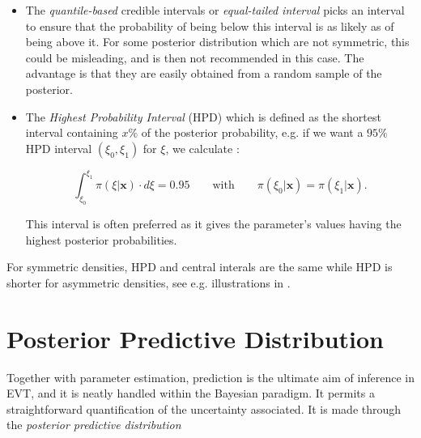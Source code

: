 \begin{itemize}
	\item The \emph{quantile-based} credible intervals or \emph{equal-tailed interval} picks an interval to ensure that the probability of being below this interval is as likely as of being above it. 
	For some posterior distribution which are not symmetric, this could be misleading, and is then not recommended in this case. 
	The advantage is that they are easily obtained from a random sample of the posterior.
	\item The \emph{Highest Probability Interval} (HPD) which is defined as the shortest interval containing $x\%$ of the posterior probability, e.g. if we want a $95\%$ HPD interval $(\xi_0,\xi_1)$ for $\xi$, we calculate :
		
	\begin{equation} 
	\int_{\xi_0}^{\xi_1}\pi(\xi|\boldsymbol{x})\cdot d\xi=0.95 \qquad\text{with}\qquad \pi(\xi_0|\boldsymbol{x})=\pi(\xi_1|\boldsymbol{x}).
	\end{equation}
		
	This interval is often preferred as it gives the parameter's values having the highest posterior probabilities. 
		
\end{itemize}
For symmetric densities, HPD and central interals are the same while HPD is shorter for asymmetric densities, see e.g. illustrations in \citet{liu_simulation-efficient_2015}.


\section{Posterior Predictive Distribution}\label{sec:ppd}

Together with parameter estimation, prediction is the ultimate aim of inference in EVT, and it is neatly handled within the Bayesian paradigm. It permits a straightforward quantification of the uncertainty associated. It is made through the \emph{posterior predictive distribution}

